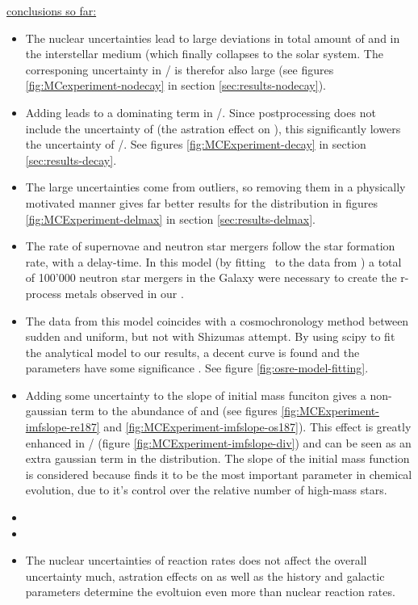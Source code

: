 \underline{conclusions so far:}
\begin{itemize}
\item The nuclear uncertainties lead to large deviations in total amount of  and  in the interstellar medium (which finally collapses to the solar system. The corresponing uncertainty in / is therefor also large (see figures \ref{fig:MCexperiment-nodecay} in section \ref{sec:results-nodecay}).
\item Adding \betadecay leads to a dominating term in /. Since postprocessing does not include the uncertainty of \betadecay (the astration effect on ), this significantly lowers the uncertainty of /. See figures \ref{fig:MCExperiment-decay} in section \ref{sec:results-decay}.
\item The large uncertainties come from outliers, so removing them in a physically motivated manner gives far better results for the distribution in figures \ref{fig:MCExperiment-delmax} in section \ref{sec:results-delmax}.
\item The rate of supernovae and neutron star mergers follow the star formation rate, with a delay-time. In this model (by fitting \omegamodel\ to the data from \eris) a total of 100'000 neutron star mergers in the Galaxy were necessary to create the r-process metals observed in our \sos.
\item The data from this model coincides with a cosmochronology method between sudden and uniform, but not with Shizumas attempt. By using scipy to fit the analytical model to our results, a decent curve is found and the parameters have some significance . See figure \ref{fig:osre-model-fitting}.
\item Adding some uncertainty to the slope of initial mass funciton gives a non-gaussian term to the abundance of  and  (see figures \ref{fig:MCExperiment-imfslope-re187} and \ref{fig:MCExperiment-imfslope-os187}). This effect is greatly enhanced in / (figure \ref{fig:MCExperiment-imfslope-div}) and can be seen as an extra gaussian term in the distribution. The slope of the initial mass function is considered because  finds it to be the most important parameter in chemical evolution, due to it's control over the relative number of high-mass stars.
\item {}
  \item {}
  \item The nuclear uncertainties of reaction rates does not affect the overall uncertainty much, astration effects on  as well as the history and galactic parameters determine the evoltuion even more than nuclear reaction rates.
\end{itemize}

